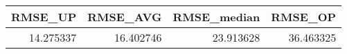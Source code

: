 \begin{tabular}{rrrr}
\toprule
  RMSE\_UP &  RMSE\_AVG &  RMSE\_median &   RMSE\_OP \\
\midrule
14.275337 & 16.402746 &    23.913628 & 36.463325 \\
\bottomrule
\end{tabular}
